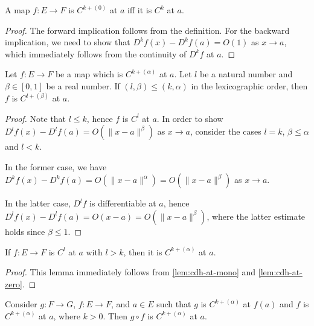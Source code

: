 \begin{lemma}%
  \label{lem:cdh-at-zero}
  A map \(f\colon E\to F\) is \(C^{k+(0)}\) at \(a\) iff it is \(C^{k}\) at \(a\).
\end{lemma}

\begin{proof}
  The forward implication follows from the definition.
  For the backward implication,
  we need to show that \(D^{k}f(x) - D^{k}f(a)=O(1)\) as \(x\to a\),
  which immediately follows from the continuity of \(D^{k}f\) at \(a\).
\end{proof}

\begin{lemma}%
  \label{lem:cdh-at-mono}
  Let \(f\colon E\to F\) be a map which is \(C^{k+(\alpha)}\) at \(a\).
  Let \(l\) be a natural number and \(\beta \in [0, 1]\) be a real number.
  If \((l, \beta) \le (k, \alpha)\) in the lexicographic order,
  then \(f\) is \(C^{l+(\beta)}\) at \(a\).
\end{lemma}

\begin{proof}
  Note that \(l\le k\), hence \(f\) is \(C^{l}\) at \(a\).
  In order to show \(D^{l}f(x) - D^{l}f(a) = O(\|x - a\|^{\beta})\) as \(x\to a\),
  consider the cases \(l = k\), \(\beta \le \alpha\) and \(l < k\).

  In the former case, we have \(D^{k}f(x) - D^{k}f(a) = O\left(\|x - a\|^{\alpha}\right)=O\left(\|x - a\|^{\beta}\right)\) as \(x\to a\).

  In the latter case, \(D^{l}f\) is differentiable at \(a\), hence \(D^{l}f(x)-D^{l}f(a)=O(x - a)=O(\|x - a\|^{\beta})\),
  where the latter estimate holds since \(\beta \le 1\).
\end{proof}

\begin{lemma}%
  \label{lem:cdh-at-of-contDiffAt}
  If \(f\colon E\to F\) is \(C^{l}\) at \(a\) with \(l > k\),
  then it is \(C^{k+(\alpha)}\) at \(a\).
\end{lemma}
\begin{proof}
  This lemma immediately follows
  from \autoref{lem:cdh-at-mono} and \autoref{lem:cdh-at-zero}.
\end{proof}

\begin{lemma}%
  \label{lem:cdh-at-comp}
  Consider \(g\colon F \to G\), \(f\colon E \to F\), and \(a \in E\)
  such that \(g\) is \(C^{k+(\alpha)}\) at \(f(a)\) and \(f\) is \(C^{k+(\alpha)}\) at \(a\), where \(k > 0\).
  Then \(g\circ f\) is \(C^{k+(\alpha)}\) at \(a\).
\end{lemma}

